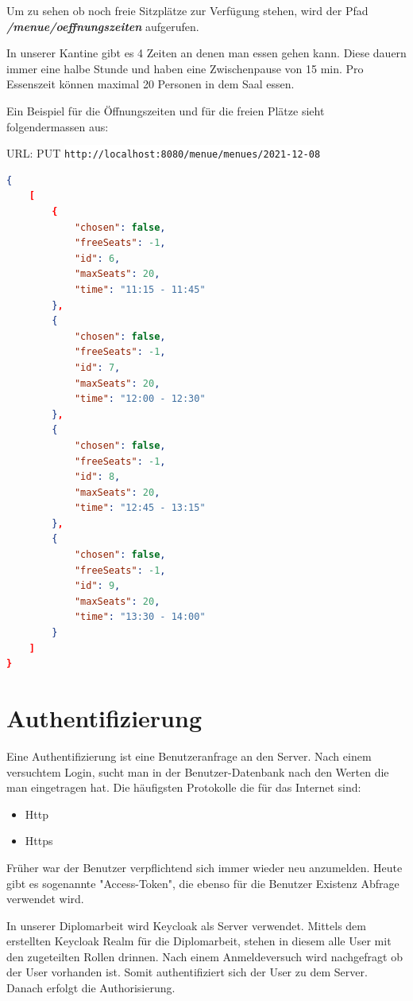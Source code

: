 Um zu sehen ob noch freie Sitzplätze zur Verfügung stehen, wird der Pfad \textbf{\textit{/menue/oeffnungszeiten}} aufgerufen. 

In unserer Kantine gibt es 4 Zeiten an denen man essen gehen kann. Diese dauern immer eine halbe Stunde und haben eine Zwischenpause von 15 min. 
Pro Essenszeit können maximal 20 Personen in dem Saal essen.

Ein Beispiel für die Öffnungszeiten und für die freien Plätze sieht folgendermassen aus:

URL: PUT \colorbox{white}{\lstinline[basicstyle=\ttfamily\color{black},language=html]|http://localhost:8080/menue/menues/2021-12-08|}


\begin{lstlisting}[language=json,firstnumber=1]
{
    [
        {
            "chosen": false,
            "freeSeats": -1,
            "id": 6,
            "maxSeats": 20,
            "time": "11:15 - 11:45"
        },
        {
            "chosen": false,
            "freeSeats": -1,
            "id": 7,
            "maxSeats": 20,
            "time": "12:00 - 12:30"
        },
        {
            "chosen": false,
            "freeSeats": -1,
            "id": 8,
            "maxSeats": 20,
            "time": "12:45 - 13:15"
        },
        {
            "chosen": false,
            "freeSeats": -1,
            "id": 9,
            "maxSeats": 20,
            "time": "13:30 - 14:00"
        }
    ]
}
\end{lstlisting}

\section{Authentifizierung}
Eine Authentifizierung ist eine Benutzeranfrage an den Server. Nach einem versuchtem Login, sucht man in der Benutzer-Datenbank
nach den Werten die man eingetragen hat. Die häufigsten Protokolle die für das Internet sind:

\begin{itemize}
    \item Http
    \item Https
\end{itemize}

Früher war der Benutzer verpflichtend sich immer wieder neu anzumelden. Heute gibt es sogenannte "Access-Token", die ebenso für
die Benutzer Existenz Abfrage verwendet wird.

In unserer Diplomarbeit wird Keycloak als Server verwendet.
Mittels dem erstellten Keycloak Realm für die Diplomarbeit, stehen in diesem alle User mit den zugeteilten Rollen drinnen.
Nach einem Anmeldeversuch wird nachgefragt ob der User vorhanden ist. 
Somit authentifiziert sich der User zu dem Server.
Danach erfolgt die Authorisierung.

